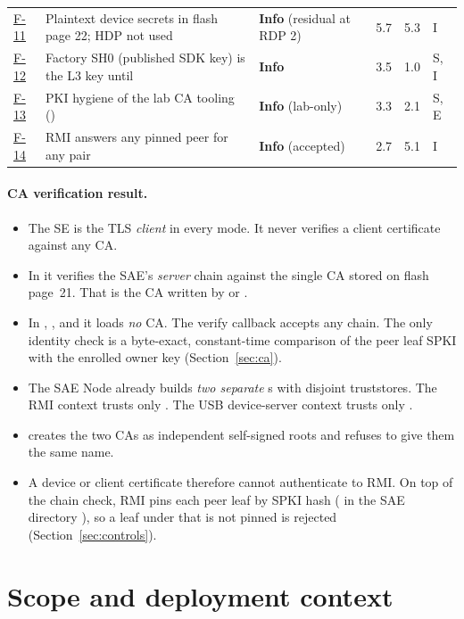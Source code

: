 \documentclass[11pt,a4paper]{article}
\newcommand{\sev}[1]{\textbf{#1}}
\begin{document}
\begin{longtable}{L{1.0cm}L{6.4cm}L{1.9cm}L{1.3cm}L{1.3cm}L{1.6cm}}
\hyperref[f:F-11]{F-11} & Plaintext device secrets in flash page 22; HDP not used & \sev{Info} (residual at RDP 2) & 5.7 & 5.3 & I\\
\hyperref[f:F-12]{F-12} & Factory SH0 (published SDK key) is the L3 key until  & \sev{Info} & 3.5 & 1.0 & S, I\\
\hyperref[f:F-13]{F-13} & PKI hygiene of the lab CA tooling () & \sev{Info} (lab-only) & 3.3 & 2.1 & S, E\\
\hyperref[f:F-14]{F-14} & RMI  answers any pinned peer for any pair & \sev{Info} (accepted) & 2.7 & 5.1 & I\\
\bottomrule
\end{longtable}

\paragraph{CA verification result.}
\begin{itemize}
\item The SE is the TLS \emph{client} in every mode. It never verifies a client certificate against any CA.
\item In  it verifies the SAE's \emph{server} chain against the single CA stored on flash page~21. That is the CA written by  or .
\item In , , and  it loads \emph{no} CA. The verify callback accepts any chain. The only identity check is a byte-exact, constant-time comparison of the peer leaf SPKI with the enrolled owner key (Section~\ref{sec:ca}).
\item The SAE Node already builds \emph{two separate} s with disjoint truststores. The RMI context trusts only . The USB device-server context trusts only .
\item {} creates the two CAs as independent self-signed roots and refuses to give them the same name.
\item A device or client certificate therefore cannot authenticate to RMI. On top of the  chain check, RMI pins each peer leaf by SPKI hash ( in the SAE directory ), so a leaf under  that is not pinned is rejected (Section~\ref{sec:controls}).
\end{itemize}
\section{Scope and deployment context}\label{sec:context}
\end{document}
